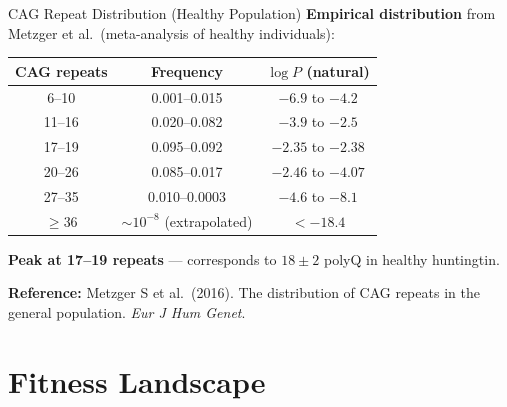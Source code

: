 \documentclass[aspectratio=169,11pt]{beamer}
\begin{document}
\begin{frame}{CAG Repeat Distribution (Healthy Population)}
    \textbf{Empirical distribution} from Metzger et al.\ (meta-analysis of healthy individuals):

    \begin{center}
        \begin{tabular}{c|c|c}
            \textbf{CAG repeats} & \textbf{Frequency} & \textbf{$\log P$ (natural)} \\ \hline
            6--10  & 0.001--0.015  & $-6.9$ to $-4.2$ \\
            11--16 & 0.020--0.082  & $-3.9$ to $-2.5$ \\
            17--19 & 0.095--0.092  & $-2.35$ to $-2.38$ \\
            20--26 & 0.085--0.017  & $-2.46$ to $-4.07$ \\
            27--35 & 0.010--0.0003 & $-4.6$ to $-8.1$ \\
            $\ge 36$ & $\sim 10^{-8}$ (extrapolated) & $< -18.4$
        \end{tabular}
    \end{center}

    \textbf{Peak at 17--19 repeats} --- corresponds to $18 \pm 2$ polyQ in healthy huntingtin.

    \textbf{Reference:} Metzger S et al.\ (2016). The distribution of CAG repeats in the general population. \textit{Eur J Hum Genet}.
\end{frame}

\section{Fitness Landscape}
\end{document}
